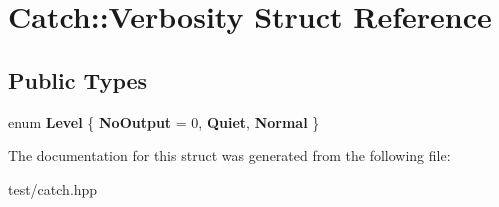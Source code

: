 \hypertarget{structCatch_1_1Verbosity}{}\section{Catch\+:\+:Verbosity Struct Reference}
\label{structCatch_1_1Verbosity}
\subsection*{Public Types}
\begin{DoxyCompactItemize}
\item 
enum {\bfseries Level} \{ {\bfseries No\+Output} = 0, 
{\bfseries Quiet}, 
{\bfseries Normal}
 \}\hypertarget{structCatch_1_1Verbosity_a4132b497ac3f69c5fc1a0fbf40ab1b01}{}\label{structCatch_1_1Verbosity_a4132b497ac3f69c5fc1a0fbf40ab1b01}

\end{DoxyCompactItemize}


The documentation for this struct was generated from the following file\+:\begin{DoxyCompactItemize}
\item 
test/catch.\+hpp\end{DoxyCompactItemize}
